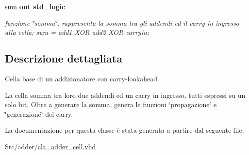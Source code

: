 \begin{DoxyCompactItemize}
\hyperlink{group___base_cell_ga0d9fc1b21b42422b12d68ad73ca8ef13}{sum}  {\bfseries {\bfseries \textcolor{vhdlchar}{out}\textcolor{vhdlchar}{ }}} {\bfseries \textcolor{vhdlchar}{std\+\_\+logic}\textcolor{vhdlchar}{ }} 
\begin{DoxyCompactList}\small\item\em funzione \char`\"{}somma\char`\"{}, rappresenta la somma tra gli addendi ed il carry in ingresso alla cella; sum = add1 X\+O\+R add2 X\+O\+R carryin; \end{DoxyCompactList}\end{DoxyCompactItemize}


\subsection{Descrizione dettagliata}
Cella base di un addizionatore con carry-\/lookahead.

La cella somma tra loro due addendi ed un carry in ingresso, tutti espressi su un solo bit. Oltre a generare la somma, genera le funzioni \char`\"{}propagazione\char`\"{} e \char`\"{}generazione\char`\"{} del carry. 

La documentazione per questa classe è stata generata a partire dal seguente file\+:\begin{DoxyCompactItemize}
\item 
Src/adder/\hyperlink{cla__adder__cell_8vhd}{cla\+\_\+adder\+\_\+cell.\+vhd}\end{DoxyCompactItemize}
